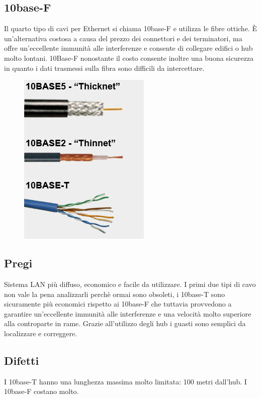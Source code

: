 \subsection{10base-F}
Il quarto tipo di cavi per Ethernet si chiama 10base-F e utilizza le fibre ottiche. È un'alternativa costosa a causa del prezzo dei connettori e dei terminatori, ma offre un'eccellente immunità alle interferenze e consente di collegare edifici o hub molto lontani. 10Base-F nonostante il costo consente inoltre una buona sicurezza in quanto i dati trasmessi sulla fibra sono difficili da intercettare.
 
\begin{figure}[H]
\centering
\includegraphics[scale=0.6]{res/img/27_CaviEthernet.png}
\end{figure}

\subsection{Pregi}
Sistema LAN più diffuso, economico e facile da utilizzare.
I primi due tipi di cavo non vale la pena analizzarli perchè ormai sono obsoleti, i 10base-T sono sicuramente più economici rispetto ai 10base-F che tuttavia provvedono a garantire un'eccellente immunità alle interferenze e una velocità molto superiore alla controparte in rame.
Grazie all'utilizzo degli hub i guasti sono semplici da localizzare e correggere.

\subsection{Difetti}
I 10base-T hanno una lunghezza massima molto limitata: 100 metri dall'hub.
I 10base-F costano molto.

